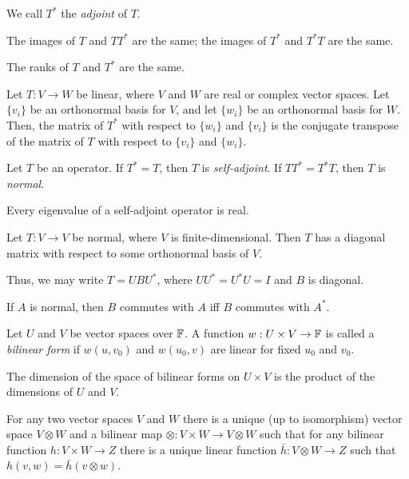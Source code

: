 \begin{defn}
  We call $T^*$ the \emph{adjoint} of $T$.
\end{defn}
\begin{prop}
    The images of $T$ and $TT^*$ are the same; the images of $T^*$ and $T^* T$
    are the same.
\end{prop}
\begin{cor}
    The ranks of $T$ and $T^*$ are the same.
\end{cor}
\begin{prop}
  Let $T:V\to W$ be linear, where $V$ and $W$ are real or complex vector spaces.
  Let $\{v_i\}$ be an orthonormal basis for $V$, and
  let $\{w_i\}$ be an orthonormal basis for $W$. Then, the matrix of $T^*$ with
  respect to $\{w_i\}$ and $\{v_i\}$ is the conjugate transpose of the matrix of
  $T$ with respect to $\{v_i\}$ and $\{w_i\}$.
\end{prop}
\begin{defn}
  Let $T$ be an operator. If $T^*=T$, then $T$ is \emph{self-adjoint}. If
  $TT^*=T^* T$, then $T$ is \emph{normal}.
\end{defn}
\begin{prop}
  Every eigenvalue of a self-adjoint operator is real.
\end{prop}
\begin{thm}[Spectral]
  Let $T:V\to V$ be normal, where $V$ is finite-dimensional. Then
  $T$ has a diagonal matrix with respect to some orthonormal basis of $V$.
\end{thm}
\begin{rem}
  Thus, we may write $T=UBU^*$, where $UU^*=U^*U=I$ and $B$ is diagonal.
\end{rem}
\begin{prop}
  If $A$ is normal, then $B$ commutes with $A$ iff $B$ commutes with $A^*$.
\end{prop}
\begin{defn}
  Let $U$ and $V$ be vector spaces over $\mathbb{F}$. A function $w:U\times V\to\mathbb{F}$
  is called a \emph{bilinear form} if $w(u,v_0)$ and $w(u_0,v)$ are linear for
  fixed $u_0$ and $v_0$.
\end{defn}
\begin{prop}
  The dimension of the space of bilinear forms on $U\times V$ is the product of
  the dimensions of $U$ and $V$.
\end{prop}
\begin{prop}
    For any two vector spaces $V$ and $W$ there is a unique (up to isomorphism)
    vector space $V\otimes W$ and a bilinear map $\otimes:V\times W\to V\otimes W$
    such that for any bilinear function $h:V\times W\to Z$ there is a unique linear
    function $\bar h:V\otimes W\to Z$ such that $h(v,w)=\bar h(v\otimes w)$.
\end{prop}
